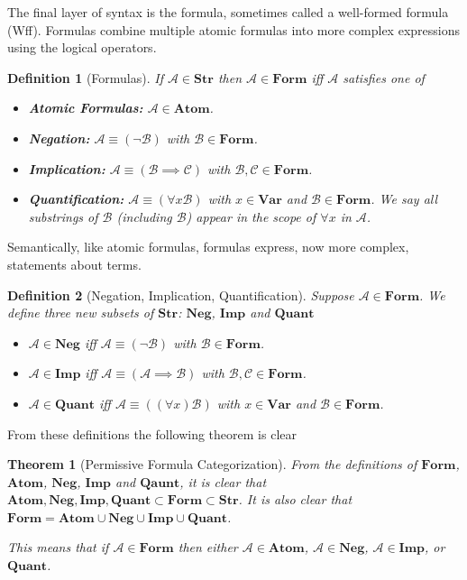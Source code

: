 \documentclass[12pt]{article}
\theoremstyle{break}
\newtheorem{definition}{Definition}[section]
\theoremstyle{break}
\newtheorem{theorem}{Theorem}[section]
\theoremstyle{break}
\theoremstyle{break}
\theoremstyle{break}
\newtheorem{informal definition}[definition]{Informal Definition}
\newcommand{\mc}[1]{\mathcal{#1}}
\begin{document}
The final layer of syntax is the formula, sometimes called a well-formed formula  (Wff).
Formulas combine multiple atomic formulas into more complex expressions using the logical operators.

\begin{definition}[Formulas]
If $\mc{A}\in\textbf{Str}$ then $\mc{A}\in\textbf{Form}$ iff $\mc{A}$ satisfies one of

\begin{itemize}
\item{\textbf{Atomic Formulas:} $\mc{A}\in\textbf{Atom}$.}
\item{\textbf{Negation:} $\mc{A}\equiv (\lnot \mc{B})$ with $\mc{B} \in \textbf{Form}$.}
\item{\textbf{Implication:} $\mc{A}\equiv (\mc{B}\implies \mc{C})$ with $\mc{B}, \mc{C} \in \textbf{Form}$.}
\item{\textbf{Quantification:} $\mc{A}\equiv (\forall x \mc{B})$ with $x\in \textbf{Var}$ and $\mc{B}\in \textbf{Form}$. We say all substrings of $\mc{B}$ (including $\mc{B}$) appear in the scope of $\forall x$ in $\mc{A}$.}
\end{itemize}
\end{definition}

Semantically, like atomic formulas, formulas express, now more complex, statements about terms.

\begin{definition}[Negation, Implication, Quantification]
Suppose $\mc{A}\in\textbf{Form}$.
We define three new subsets of $\textbf{Str}$: $\textbf{Neg}$, $\textbf{Imp}$ and $\textbf{Quant}$
\begin{itemize}
\item{$\mc{A}\in\textbf{Neg}$ iff $\mc{A}\equiv (\lnot \mc{B})$ with $\mc{B}\in\textbf{Form}$.}
\item{$\mc{A}\in\textbf{Imp}$ iff $\mc{A}\equiv (\mc{A}\implies \mc{B})$ with $\mc{B}, \mc{C}\in\textbf{Form}$.}
\item{$\mc{A}\in\textbf{Quant}$ iff $\mc{A} \equiv ((\forall x)\mc{B})$ with $x\in\textbf{Var}$ and $\mc{B}\in\textbf{Form}$.}
\end{itemize}
\end{definition}

From these definitions the following theorem is clear

\begin{theorem}[Permissive Formula Categorization]
\label{thm:synt:formcats}
From the definitions of $\textbf{Form}$, $\textbf{Atom}$, $\textbf{Neg}$, $\textbf{Imp}$ and $\textbf{Qaunt}$, it is clear that $\textbf{Atom}, \textbf{Neg}, \textbf{Imp}, \textbf{Quant} \subset \textbf{Form}\subset \textbf{Str}$.
It is also clear that $\textbf{Form} = \textbf{Atom}\cup \textbf{Neg} \cup \textbf{Imp} \cup \textbf{Quant}$.

This means that if $\mc{A}\in\textbf{Form}$ then either $\mc{A}\in\textbf{Atom}$, $\mc{A}\in\textbf{Neg}$, $\mc{A}\in\textbf{Imp}$, or $\textbf{Quant}$.
\end{theorem}
\end{document}

